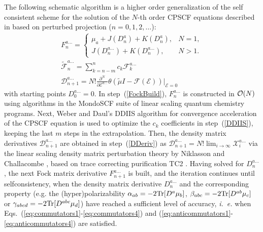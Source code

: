 \documentclass[prl,aps,letterpaper,twocolumn,showpacs,twocolumngrid,superbib]{revtex4}
\def\Tr{{\rm Tr}}
\def\F{\mathcal{F}}
\def\D{\mathcal{D}}
\def\X{\mathcal{X}}
\def\E{\mathcal{E}}
\begin{document}
The following schematic algorithm is a higher order generalization of the
self consistent scheme for the solution of the $N$-th order CPSCF equations described 
in \cite{Weber04} based on perturbed projection ($n = 0,1,2,\ldots$):
\begin{subequations}
  \begin{gather}
    F^{a\ldots}_{n}= \left\{
    \begin{array}{ll}
      \mu_a+J(D^{a}_n)+K(D^{a}_n), & N=1\label{FockBuild},\\
      J(D^{a\ldots}_n)+K(D^{a\ldots}_n), & N>1.
    \end{array}\right.\\
    \displaystyle\widetilde{\F}^{a\ldots}_{n}=\sum_{k=n-m}^{n}c_k \F^{a\ldots}_{k} \label{DDIIS} \\
    \displaystyle\D^{a\ldots}_{n+1}=N!
    \frac{\partial^N}{\partial\E^{a\ldots}}\theta(\tilde{\mu}I-
    \F(\E))\bigg|_{\E=0} \label{DDeriv}
  \end{gather} 
\end{subequations}
with starting points $D^{a\ldots}_0=0$. In step~(\ref{FockBuild}),  
$F^{a\ldots}_n$ is constructed in ${\cal O}(N)$ using algorithms 
\cite{MChallacombe97,ESchwegler97} in the {\sc MondoSCF} \cite{MondoSCF} 
suite of linear scaling quantum chemistry programs.  Next,
Weber and Daul's DDIIS algorithm for convergence acceleration 
of the CPSCF equation \cite{Weber_2003} is used to optimize 
the $c_k$ coefficients in step~(\ref{DDIIS}), 
keeping the last $m$ steps in the extrapolation.
Then, the density matrix derivatives $\D^{a\ldots}_{n+1}$ are obtained
in step~(\ref{DDeriv}) as $\D^{a\ldots}_{n+1}=N!\lim_{i\to\infty}\X^{a\ldots}_i$
via the linear scaling density matrix perturbation theory by Niklasson
and Challacombe \cite{ANiklasson04}, based on 
trace correcting purification TC2 \cite{ANiklasson02A}. Having solved 
for $D^{a\ldots}_n$, the next Fock 
matrix derivative $F^{a\ldots}_{n+1}$ is built, and the iteration continues until 
selfconsistency, when the density matrix derivative $D^{a\ldots}_n$ and the 
corresponding property (e.g. the (hyper)polarizability $\alpha_{ab}=-2\Tr[D^a\mu_b]$, 
$\beta_{abc}=-2\Tr[D^{ab}\mu_c]$ or $\gamma_{abcd}=-2\Tr[D^{abc}\mu_d]$)
have reached a sufficient level of accuracy, {\em i.\ e.} when 
Eqs.\ (\ref{eq:commutators1}-\ref{eq:commutators4}) 
and (\ref{eq:anticommutators1}-\ref{eq:anticommutators4}) are satisfied.
\end{document}
